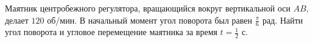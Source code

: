 Маятник центробежного регулятора, вращающийся вокруг вертикальной оси
$AB$, делает $120$ об/мин. В начальный момент угол поворота был равен
$\frac{\pi}{6}$ рад. Найти угол поворота и угловое перемещение маятника
за время $t=\frac{1}{2}$ с.

